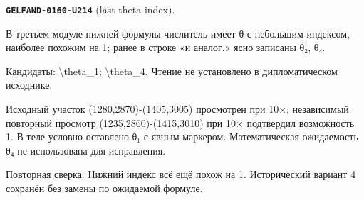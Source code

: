 \par\noindent\leavevmode{}\label{GELFAND-0160-U214}\label{GELFAND-P001479:last-theta-index}\textbf{\texttt{GELFAND-0160-U214}} (last-theta-index).\nopagebreak[4]\par
В третьем модуле нижней формулы числитель имеет θ с небольшим индексом, наиболее похожим на 1; ранее в строке «и аналог.» ясно записаны θ₂, θ₄.\par
Кандидаты: \textbackslash{}theta\_1; \textbackslash{}theta\_4. Чтение не установлено в дипломатическом исходнике.\par
Исходный участок (1280,2870)-(1405,3005) просмотрен при 10×; независимый повторный просмотр (1235,2860)-(1415,3010) при 10× подтвердил возможность 1. В теле условно оставлено θ₁ с явным маркером. Математическая ожидаемость θ₄ не использована для исправления.\par
Повторная сверка: Нижний индекс всё ещё похож на 1. Исторический вариант 4 сохранён без замены по ожидаемой формуле.\par\medskip
